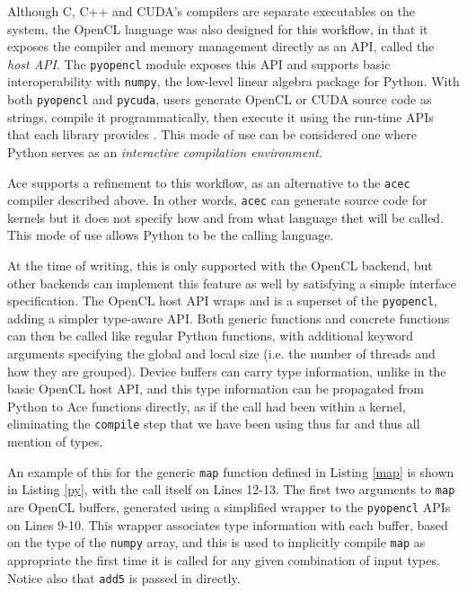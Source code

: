 \documentclass[9pt,preprint]{sigplanconf}
\begin{document}
Although C, C++ and CUDA's compilers are separate executables on the system, the OpenCL language was also designed for this workflow, in that it exposes the compiler and memory management directly as an API, called the \emph{host API}. The \verb|pyopencl| module exposes this API and supports basic interoperability with \verb|numpy|, the low-level linear algebra package for Python. With both \verb|pyopencl| and \verb|pycuda|, users generate OpenCL or CUDA source code as strings, compile it programmatically, then execute it using the run-time APIs that each library provides \cite{klockner2011pycuda}. This mode of use can be considered one where Python serves as an \emph{interactive compilation environment}.

Ace supports a refinement to this workflow, as an alternative to the \verb|acec| compiler described above. In other words, \verb|acec| can generate source code for kernels but it does not specify how and from what language thet will be called. This mode of use allows Python to be the calling language.

At the time of writing, this is only supported with the OpenCL backend, but other backends can implement this feature as well by satisfying a simple interface specification. The OpenCL host API wraps and is a superset of the \verb|pyopencl|, adding a simpler type-aware API. Both generic functions and concrete functions can then be called like regular Python functions, with additional keyword arguments specifying the global and local size (i.e. the number of threads and how they are grouped). Device buffers can carry type information, unlike in the basic OpenCL host API, and this type information can be propagated from Python to Ace functions directly, as if the call had been within a kernel,  eliminating the \verb|compile| step that we have been using thus far and thus all mention of types. 

An example of this for the generic \verb|map| function defined in Listing \ref{map} is shown in Listing \ref{py}, with the call itself on Lines 12-13. 
The first two arguments to \verb|map| are OpenCL buffers, generated using a simplified wrapper to the \verb|pyopencl| APIs on Lines 9-10. This wrapper associates type information with each buffer, based on the type of the \verb|numpy| array, and this is used to implicitly compile \verb|map| as appropriate the first time it is called for any given combination of input types. Notice also that \verb|add5| is passed in directly.
\end{document}
